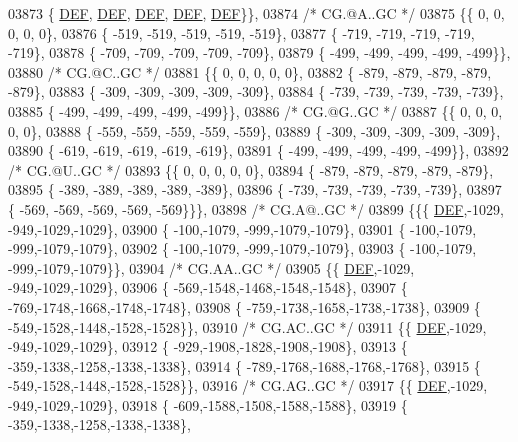 \begin{DoxyCode}
03873 \{  \mbox{\hyperlink{1_88_84__epars_8h_a397419fc12b37ed479c8abb9d444d843}{DEF}},  \mbox{\hyperlink{1_88_84__epars_8h_a397419fc12b37ed479c8abb9d444d843}{DEF}},  \mbox{\hyperlink{1_88_84__epars_8h_a397419fc12b37ed479c8abb9d444d843}{DEF}},  \mbox{\hyperlink{1_88_84__epars_8h_a397419fc12b37ed479c8abb9d444d843}{DEF}},  \mbox{\hyperlink{1_88_84__epars_8h_a397419fc12b37ed479c8abb9d444d843}{DEF}}\}\},
03874 \textcolor{comment}{/* CG.@A..GC */}
03875 \{\{    0,    0,    0,    0,    0\},
03876 \{ -519, -519, -519, -519, -519\},
03877 \{ -719, -719, -719, -719, -719\},
03878 \{ -709, -709, -709, -709, -709\},
03879 \{ -499, -499, -499, -499, -499\}\},
03880 \textcolor{comment}{/* CG.@C..GC */}
03881 \{\{    0,    0,    0,    0,    0\},
03882 \{ -879, -879, -879, -879, -879\},
03883 \{ -309, -309, -309, -309, -309\},
03884 \{ -739, -739, -739, -739, -739\},
03885 \{ -499, -499, -499, -499, -499\}\},
03886 \textcolor{comment}{/* CG.@G..GC */}
03887 \{\{    0,    0,    0,    0,    0\},
03888 \{ -559, -559, -559, -559, -559\},
03889 \{ -309, -309, -309, -309, -309\},
03890 \{ -619, -619, -619, -619, -619\},
03891 \{ -499, -499, -499, -499, -499\}\},
03892 \textcolor{comment}{/* CG.@U..GC */}
03893 \{\{    0,    0,    0,    0,    0\},
03894 \{ -879, -879, -879, -879, -879\},
03895 \{ -389, -389, -389, -389, -389\},
03896 \{ -739, -739, -739, -739, -739\},
03897 \{ -569, -569, -569, -569, -569\}\}\},
03898 \textcolor{comment}{/* CG.A@..GC */}
03899 \{\{\{  \mbox{\hyperlink{1_88_84__epars_8h_a397419fc12b37ed479c8abb9d444d843}{DEF}},-1029, -949,-1029,-1029\},
03900 \{ -100,-1079, -999,-1079,-1079\},
03901 \{ -100,-1079, -999,-1079,-1079\},
03902 \{ -100,-1079, -999,-1079,-1079\},
03903 \{ -100,-1079, -999,-1079,-1079\}\},
03904 \textcolor{comment}{/* CG.AA..GC */}
03905 \{\{  \mbox{\hyperlink{1_88_84__epars_8h_a397419fc12b37ed479c8abb9d444d843}{DEF}},-1029, -949,-1029,-1029\},
03906 \{ -569,-1548,-1468,-1548,-1548\},
03907 \{ -769,-1748,-1668,-1748,-1748\},
03908 \{ -759,-1738,-1658,-1738,-1738\},
03909 \{ -549,-1528,-1448,-1528,-1528\}\},
03910 \textcolor{comment}{/* CG.AC..GC */}
03911 \{\{  \mbox{\hyperlink{1_88_84__epars_8h_a397419fc12b37ed479c8abb9d444d843}{DEF}},-1029, -949,-1029,-1029\},
03912 \{ -929,-1908,-1828,-1908,-1908\},
03913 \{ -359,-1338,-1258,-1338,-1338\},
03914 \{ -789,-1768,-1688,-1768,-1768\},
03915 \{ -549,-1528,-1448,-1528,-1528\}\},
03916 \textcolor{comment}{/* CG.AG..GC */}
03917 \{\{  \mbox{\hyperlink{1_88_84__epars_8h_a397419fc12b37ed479c8abb9d444d843}{DEF}},-1029, -949,-1029,-1029\},
03918 \{ -609,-1588,-1508,-1588,-1588\},
03919 \{ -359,-1338,-1258,-1338,-1338\},

\end{DoxyCode}
